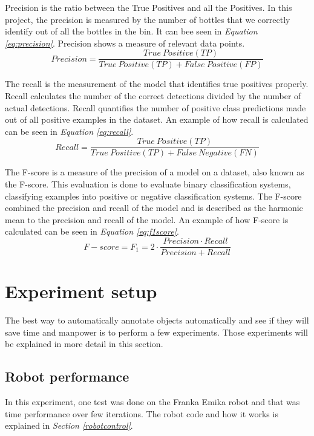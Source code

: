 Precision is the ratio between the True Positives and all the Positives. In this project, the precision is measured by the number of bottles that we correctly identify out of all the bottles in the bin. It can bee seen in \textit{Equation \ref{eq:precision}}. Precision shows a measure of relevant data points\cite{shung_accuracy_2020}.
\begin{equation}
    Precision = \frac{True\ Positive(TP)}{True\ Positive(TP)+False \ Positive(FP)}
    \label{eq:precision}
\end{equation}


The recall is the measurement of the model that identifies true positives properly. Recall calculates the number of the correct detections divided by the number of actual detections\cite{shung_accuracy_2020}. Recall quantifies the number of positive class predictions made out of all positive examples in the dataset. An example of how recall is calculated can be seen in \textit{Equation \ref{eq:recall}}.
\begin{equation}
    Recall = \frac{True\ Positive(TP)}{True\ Positive(TP)+False \ Negative(FN)}
    \label{eq:recall}
\end{equation}

The F-score is a measure of the precision of a model on a dataset, also known as the F-score. This evaluation is done to evaluate binary classification systems, classifying examples into positive or negative classification systems. 
The F-score combined the precision and recall of the model and is described as the harmonic mean to the precision and recall of the model\cite{wood_f-score_2019}.
An example of how F-score is calculated can be seen in \textit{Equation \ref{eq:f1score}}.
\begin{equation}
    F- score = F_1 = 2 \cdot \frac{Precision \cdot Recall}{Precision + Recall}
    \label{eq:f1score}
\end{equation}


\section{Experiment setup}
The best way to automatically annotate objects automatically and see if they will save time and manpower is to perform a few experiments. Those experiments will be explained in more detail in this section.

\subsection{Robot performance}
In this experiment, one test was done on the Franka Emika robot and that was time performance over few iterations. The robot code and how it works is explained in \textit{Section \ref{robotcontrol}}.

